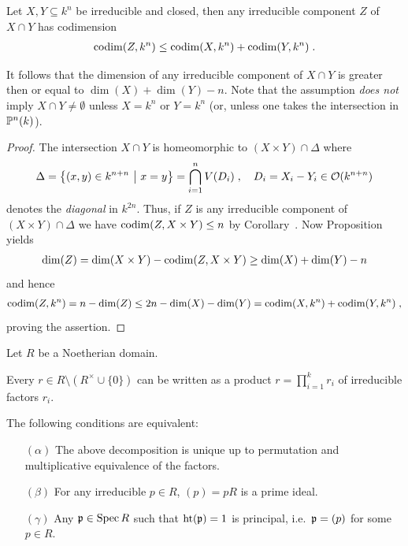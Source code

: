 \documentclass[a4paper,parskip=half,numbers=enddot, DIV=12]{scrreprt}
\begin{document}
\begin{thm}
    Let $X,Y\subseteq k^n$ be irreducible and closed, then any irreducible component $Z$ of $X\cap Y$ has codimension 
    \begin{align*}
    	\operatorname{codim}(Z,k^n)\leq\operatorname{codim}(X,k^n) +\operatorname{codim}(Y,k^n)\;.
    \end{align*}
\end{thm}
\begin{rem*}
    It follows that the dimension of any irreducible component of $X\cap Y$ is greater then or equal to $\dim (X)+\dim (Y) -n$. Note that the assumption \emph{does not} imply $X\cap Y \not= \emptyset$ unless $X=k^n$ or $Y=k^n$ (or, unless one takes the intersection in $\mathbb{P}^n(k)$).
\end{rem*}
\begin{proof}
    The intersection $X\cap Y$ is homeomorphic to $(X\times Y)\cap \Delta$ where 
    \begin{align*}
    	\Delta = \left\{(x,y)\in k^{n+n}\ \middle|\  x=y\right\} = \bigcap_{i=1}^n V(D_i)\;,\quad D_i = X_i -Y_i \in \mathcal{O}(k^{n+n})
    \end{align*}
    denotes the \emph{diagonal} in $k^{2n}$. Thus, if $Z$ is any irreducible component of $(X\times Y)\cap \Delta$ we have $\operatorname{codim}(Z,X\times Y) \leq n$ by Corollary~.  Now Proposition~ yields
    \begin{align*}
	    \dim(Z) = \dim(X\times Y) -\operatorname{codim}(Z,X\times Y) \geq \dim(X)+\dim(Y) -n
    \end{align*}
   and hence
   \begin{align*}
	   	\operatorname{codim}(Z,k^n) = n-\dim(Z) \leq 2n -\dim (X) -\dim (Y) = \operatorname{codim}(X,k^n)+\operatorname{codim}(Y,k^n)\;,
   \end{align*}
   proving the assertion.
\end{proof}
\begin{thm}
 Let $R$ be a Noetherian domain. 
 \begin{alphanumerate}
    \item 
        Every $r\in R\setminus (R^\times \cup\{0\})$ can be written as a product $r = \prod_{i=1}^k r_i$ of irreducible factors $r_i$. 
    \item 
        The following conditions are equivalent:
        \begin{itemize}
            \item[$(\alpha)$]
                The above decomposition is unique up to permutation and multiplicative equivalence of the factors.
            \item[$(\beta)$]
                For any irreducible $p\in R$, $(p)=pR$ is a prime ideal.
            \item[$(\gamma)$]
                Any $\mathfrak{p}\in\operatorname{Spec} R$ such that $\operatorname{ht}(\mathfrak{p}) = 1$ is principal, i.e.\ $\mathfrak{p} = (p)$ for some $p\in R$.
        \end{itemize}
 \end{alphanumerate}
\end{thm}
\end{document}
